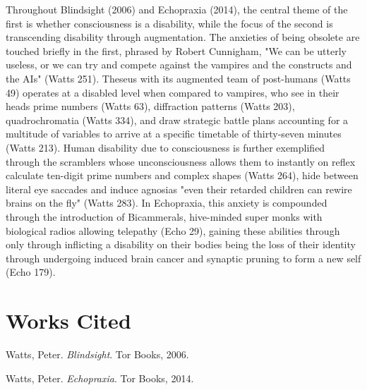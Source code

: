 \documentclass[12pt]{article}
\begin{document}
Throughout Blindsight (2006) and Echopraxia (2014), the central theme of the first is whether consciousness is a disability, while the focus of the second is transcending disability through augmentation. The anxieties of being obsolete are touched briefly in the first, phrased by Robert Cunnigham, "We can be utterly useless, or we can try and compete against the vampires and the constructs and the AIs" \cite{blindsight} (Watts 251). Theseus with its augmented team of post-humans \cite{blindsight} (Watts 49) operates at a disabled level when compared to vampires, who see in their heads prime numbers \cite{blindsight} (Watts 63), diffraction patterns \cite{blindsight} (Watts 203), quadrochromatia \cite{blindsight} (Watts 334), and draw strategic battle plans accounting for a multitude of variables to arrive at a specific timetable of thirty-seven minutes \cite{blindsight} (Watts 213). Human disability due to consciousness is further exemplified through the scramblers whose unconsciousness allows them to instantly on reflex calculate ten-digit prime numbers and complex shapes \cite{blindsight} (Watts 264), hide between literal eye saccades and induce agnosias "even their retarded children can rewire brains on the fly" \cite{blindsight} (Watts 283). In Echopraxia, this anxiety is compounded through the introduction of Bicammerals, hive-minded super monks with biological radios allowing telepathy \cite{echopraxia} (Echo 29), gaining these abilities through only through inflicting a disability on their bodies being the loss of their identity through undergoing induced brain cancer and synaptic pruning to form a new self \cite{echopraxia} (Echo 179).

\section*{Works Cited}
\begingroup
\renewcommand{\section}[2]{}%
\begin{thebibliography}{9}
Watts, Peter. \textit{Blindsight}. Tor Books, 2006.

Watts, Peter. \textit{Echopraxia}. Tor Books, 2014.
\end{thebibliography}
\endgroup
\end{document}
